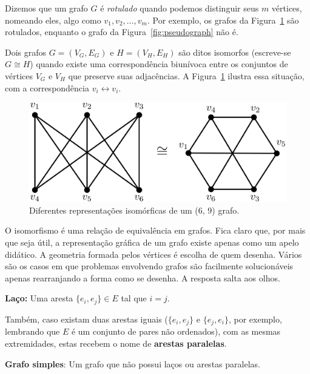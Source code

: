 \documentclass[a4paper,12pt]{article}
\begin{document}
Dizemos que um grafo $G$ é \textit{rotulado} quando podemos distinguir seus $m$ vértices, nomeando eles, algo como $v_1, v_2, \dots, v_m$. Por exemplo, os grafos da Figura~\ref{fig:graphisomorphic} são rotulados, enquanto o grafo da Figura~\ref{fig:pseudograph} não é.

Dois grafos $G = (V_G, E_G)$ e $H = (V_H, E_H)$ são ditos isomorfos (escreve-se $G \cong H$) quando existe uma correspondência biunívoca entre os conjuntos de vértices $V_G$ e $V_H$ que preserve suas adjacências. A Figura~\ref{fig:graphisomorphic} ilustra essa situação, com a correspondência $v_i \longleftrightarrow v_i$.

\begin{figure}[H]
	\begin{center}
		\includegraphics[width=0.6\linewidth]{graphisomorphic.png}
	\end{center}
	\caption{Diferentes representações isomórficas de um (6, 9) grafo.}
	\label{fig:graphisomorphic}
\end{figure}

O isomorfismo é uma relação de equivalência em grafos. Fica claro que, por mais que seja útil, a representação gráfica de um grafo existe apenas como um apelo didático. A geometria formada pelos vértices é escolha de quem desenha. Vários são os casos em que problemas envolvendo grafos são facilmente solucionáveis apenas rearranjando a forma como se desenha. A resposta salta aos olhos.

\begin{center}
	\begin{minipage}{0.9 \linewidth}
		\textbf{Laço:} Uma aresta $\{e_i, e_j\} \in E$ tal que $i = j$.
	\end{minipage}
\end{center}

Também, caso existam duas arestas iguais ($\{e_i, e_j\}$ e 
$\{e_j, e_i\}$, por exemplo, lembrando que $E$ é um conjunto de pares não ordenados), com as mesmas extremidades, estas recebem o nome de \textbf{arestas paralelas}.

\begin{center}
	\begin{minipage}{0.9 \linewidth}
		\textbf{Grafo simples}: Um grafo que não possui laços ou arestas paralelas.
	\end{minipage}
\end{center}
\end{document}

